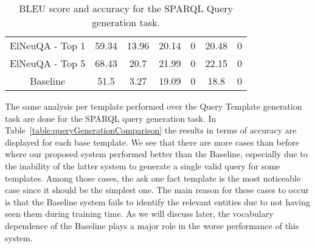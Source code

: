 \begin{table}[h!]
\begin{tabular}{|c|cc|cc|cc|}
    ElNeuQA - Top 1                  & 59.34                                                                               & 13.96                                                             & 20.14                                                                               & 0                                                                 & 20.48                                                                               & 0                                                                 \\
    ElNeuQA - Top 5                  & 68.43                                                                               & 20.7                                                              & 21.99                                                                               & 0                                                                 & 22.15                                                                               & 0                                                                 \\ \hline
    Baseline                         & 51.5                                                                                & 3.27                                                              & 19.09                                                                               & 0                                                                 & 18.8                                                                                & 0                                                                 \\ \hline
    \end{tabular}%
    \caption{BLEU score and accuracy for the SPARQL Query generation task.}
    \label{table:queryGenerationTestResults}
\end{table}

The same analysis per template performed over the Query Template generation task are done for the 
SPARQL query generation task. In Table~\ref{table:queryGenerationComparison} the results in terms 
of accuracy are displayed for each \LCQuADtwo{} base template. We see that there are more cases than 
before where our proposed system performed better than the Baseline, especially due to the 
inability of the latter system to generate a single valid query for some templates. Among those 
cases, the ask one fact template is the most noticeable case since it should be the simplest one. 
The main reason for these cases to occur is that the Baseline system fails to identify the 
relevant entities due to not having seen them during training time. As we will discuss later, the 
vocabulary dependence of the Baseline plays a major role in the worse performance of this system. 


